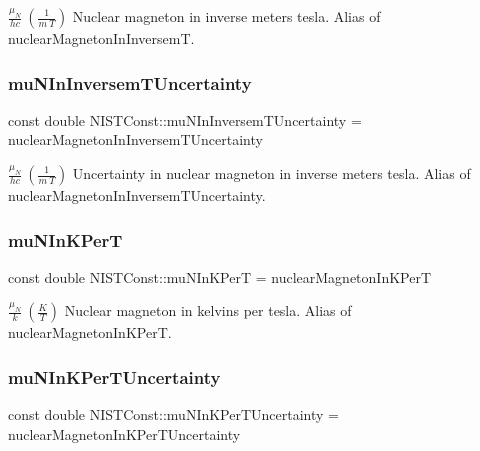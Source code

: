 $\frac{\mu_N}{hc} \ (\frac{1}{m\ T})$ Nuclear magneton in inverse meters tesla. Alias of nuclear\+Magneton\+In\+InversemT. \mbox{\label{group___nuclear_magneton_ga863b9f210eb86d33267fcb9b38b24082}} 
\subsubsection{\texorpdfstring{mu\+N\+In\+Inversem\+T\+Uncertainty}{muNInInversemTUncertainty}}
{\footnotesize\ttfamily const double N\+I\+S\+T\+Const\+::mu\+N\+In\+Inversem\+T\+Uncertainty = nuclear\+Magneton\+In\+Inversem\+T\+Uncertainty}

$\frac{\mu_N}{hc} \ (\frac{1}{m\ T})$ Uncertainty in nuclear magneton in inverse meters tesla. Alias of nuclear\+Magneton\+In\+Inversem\+T\+Uncertainty. \mbox{\label{group___nuclear_magneton_gaca6a801a34347be9fd04e7882187484c}} 
\subsubsection{\texorpdfstring{mu\+N\+In\+K\+PerT}{muNInKPerT}}
{\footnotesize\ttfamily const double N\+I\+S\+T\+Const\+::mu\+N\+In\+K\+PerT = nuclear\+Magneton\+In\+K\+PerT}

$\frac{\mu_N}{k} \ (\frac{K}{T})$ Nuclear magneton in kelvins per tesla. Alias of nuclear\+Magneton\+In\+K\+PerT. \mbox{\label{group___nuclear_magneton_ga235e592dc664f715a256c4ee49410486}} 
\subsubsection{\texorpdfstring{mu\+N\+In\+K\+Per\+T\+Uncertainty}{muNInKPerTUncertainty}}
{\footnotesize\ttfamily const double N\+I\+S\+T\+Const\+::mu\+N\+In\+K\+Per\+T\+Uncertainty = nuclear\+Magneton\+In\+K\+Per\+T\+Uncertainty}


